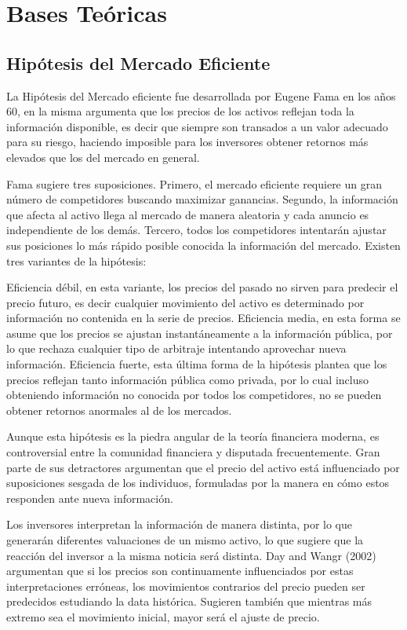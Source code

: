\documentclass[a4paper,12pt]{Latex/Classes/PhDthesisPSnPDF}
\begin{document}
\section{Bases Teóricas}


\subsection{Hipótesis del Mercado Eficiente}

La Hipótesis del Mercado eficiente fue desarrollada por Eugene Fama en los años 60, en la misma argumenta que los precios de los activos reflejan toda la información disponible, es decir que siempre son transados a un valor adecuado para su riesgo, haciendo imposible para los inversores obtener retornos más elevados que los del mercado en general. 

Fama sugiere tres suposiciones. Primero, el mercado eficiente requiere un gran número de competidores buscando maximizar ganancias. Segundo, la información que afecta al activo llega al mercado de manera aleatoria y cada anuncio es independiente de los demás. Tercero, todos los competidores intentarán ajustar sus posiciones lo más rápido posible conocida la información del mercado. Existen tres variantes de la hipótesis:

Eficiencia débil, en esta variante, los precios del pasado no sirven para predecir el precio futuro, es decir cualquier movimiento del activo es determinado por información no contenida en la serie de precios. Eficiencia media, en esta forma se asume que los precios se ajustan instantáneamente a la información pública, por lo que rechaza cualquier tipo de arbitraje intentando aprovechar nueva información. Eficiencia fuerte, esta última forma de la hipótesis plantea que los precios reflejan tanto información pública como privada, por lo cual incluso obteniendo información no conocida por todos los competidores, no se pueden obtener retornos anormales al de los mercados.

Aunque esta hipótesis es la piedra angular de la teoría financiera moderna, es controversial entre la comunidad financiera y disputada frecuentemente. Gran parte de sus detractores argumentan que el precio del activo está influenciado por suposiciones sesgada de los individuos, formuladas por la manera en cómo estos responden ante nueva información.

Los inversores interpretan la información de manera distinta, por lo que generarán diferentes valuaciones de un mismo activo, lo que sugiere que la reacción del inversor a la misma noticia será distinta. Day and Wangr (2002) argumentan que si los precios son continuamente influenciados por estas interpretaciones erróneas, los movimientos contrarios del precio pueden ser predecidos estudiando la data histórica. Sugieren también que mientras más extremo sea el movimiento inicial, mayor será el ajuste de precio.
\end{document}

